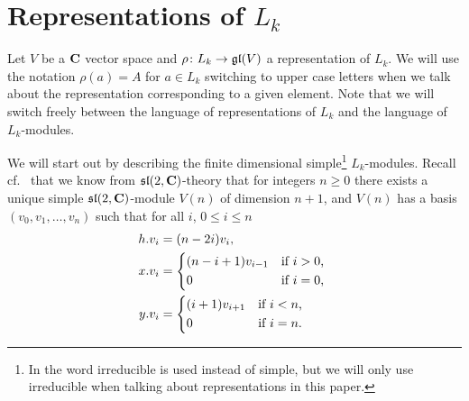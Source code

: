 \section{Representations of \texorpdfstring{$L_k$}{L\_k}}

Let $V$ be a $\mathbf{C}$ vector space and $\rho\colon L_k \to \mathfrak{gl}(V)$ a representation of $L_k$. We will use the notation $\rho(a)=A$ for $a\in L_k$ switching to upper case letters when we talk about the representation corresponding to a given element. Note that we will switch freely between the language of representations of $L_k$ and the language of $L_k$-modules.

We will start out by describing the finite dimensional simple\footnote{In \cite{indecompReprOfLorGr} the word irreducible is used instead of simple, but we will only use irreducible when talking about representations in this paper.} $L_k$-modules. Recall cf.\ \cite[36]{jantzen} that we know from $\mathfrak{sl}(2,\mathbf{C})$-theory that for integers $n\geq 0$ there exists a unique simple $\mathfrak{sl}(2,\mathbf{C})$-module $V(n)$ of dimension $n+1$, and $V(n)$ has a basis $(v_0,v_1,\dotsc,v_n)$ such that for all $i$, $0\leq i\leq n$
\begin{align}
  \begin{split}\label{eq:sl2modbasis}
    h.v_i &= (n-2i)v_i, \\
    x.v_i &=
    \begin{dcases*}
      (n-i+1)v_{i-1} & if $i>0$, \\
      0 & if $i=0$,
    \end{dcases*} \\
    y.v_i &=
    \begin{dcases*}
      (i+1)v_{i+1} & if $i<n$, \\
      0 & if $i=n$.
    \end{dcases*}
  \end{split}
\end{align}


